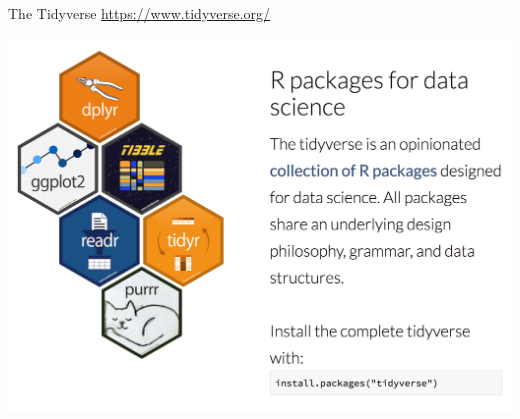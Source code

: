 \documentclass[10pt]{beamer}
\begin{document}
\begin{frame}{The Tidyverse}
  \centering
  \url{https://www.tidyverse.org/}
  \bigskip
  
  \includegraphics[height=.8\textheight]{../imgs/tidyverse.png}
  
\end{frame}
\end{document}

